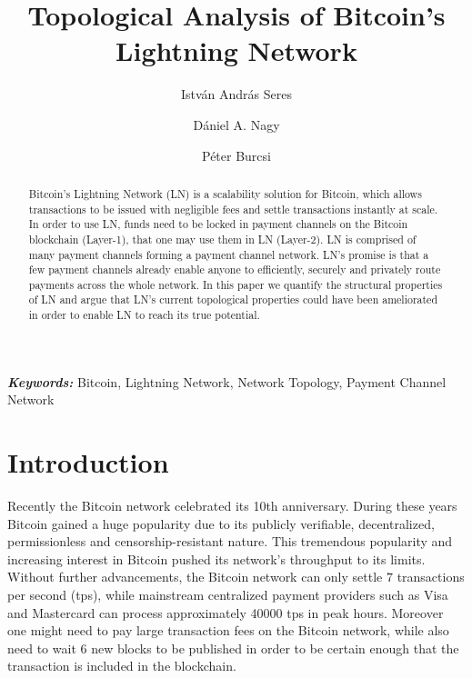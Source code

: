 \documentclass[a4paper]{article}
\title{Topological Analysis of Bitcoin's Lightning Network }
\author[1]{István András Seres}
\author[1]{Dániel A. Nagy}
\author[1]{Péter Burcsi}
\affil[1]{Department of Computer Algebra, Eötvös Loránd University}
\theoremstyle{definition}
\providecommand{\keywords}[1]{\textbf{\textit{Keywords:}} #1}
\begin{document}
\maketitle

\begin{abstract}
Bitcoin's Lightning Network (LN) is a scalability solution for Bitcoin, which allows transactions to be issued with negligible fees and settle transactions instantly at scale. In order to use LN, funds need to be locked in payment channels on the Bitcoin blockchain (Layer-1), that one may use them in LN (Layer-2). LN is comprised of many payment channels forming a payment channel network. LN's promise is that a few payment channels already enable anyone to efficiently, securely and privately route payments across the whole network. In this paper we quantify the structural properties of LN and argue that LN's current topological properties could have been ameliorated in order to enable LN to reach its true potential.  
\end{abstract}
\keywords{Bitcoin, Lightning Network, Network Topology, Payment Channel Network}

\section{Introduction}
Recently the Bitcoin \cite{nakamoto2008bitcoin} network celebrated its 10th anniversary. During these years Bitcoin gained a huge popularity due to its publicly verifiable, decentralized, permissionless and censorship-resistant nature. This tremendous popularity and increasing interest in Bitcoin pushed its network's throughput to its limits. Without further advancements, the Bitcoin network can only settle $7$ transactions per second (tps), while mainstream centralized payment providers such as Visa and Mastercard can process approximately \num[group-separator={,}]{40000} tps in peak hours. Moreover one might need to pay large transaction fees on the Bitcoin network, while also need to wait 6 new blocks to be published in order to be certain enough that the transaction is included in the blockchain.
\end{document}
